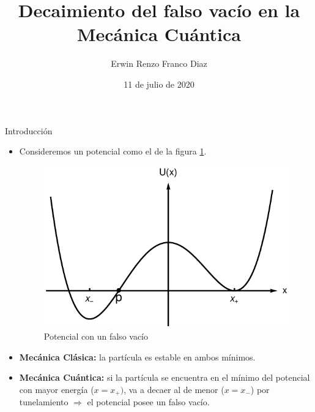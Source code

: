 \documentclass{beamer}
\title[Decaimiento del FV en la MC]{Decaimiento del falso vacío en la Mecánica Cuántica}
\author{Erwin Renzo Franco Diaz}
\date{11 de julio de 2020}
\theoremstyle{example}
\theoremstyle{example}
\begin{document}
\maketitle

\begin{frame}{Introducción}
    
\begin{itemize}
    \item Consideremos un potencial como el de la figura \ref{fig:potencial}.
    
    \begin{figure}
        \centering
        \includegraphics[scale = 0.3]{potencial.png}
        \caption{Potencial con un falso vacío}
        \label{fig:potencial}
    \end{figure}
    
    \item \textbf{Mecánica Clásica:} la partícula es estable en ambos mínimos.
    
    \item \textbf{Mecánica Cuántica:} si la partícula se encuentra en el mínimo del potencial con mayor energía ($x = x_+)$, va a decaer al de menor ($x = x_-$) por tunelamiento $\Rightarrow$ el potencial posee un falso vacío.
\end{itemize}
\end{frame}
\end{document}

